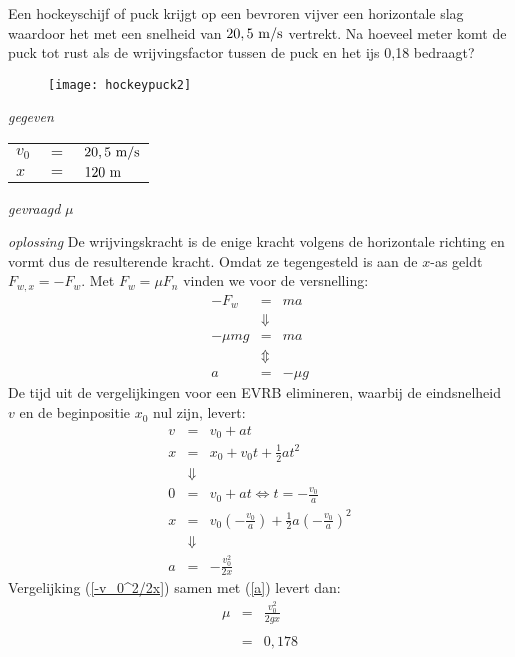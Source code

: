 \item Een hockeyschijf of puck krijgt op een bevroren vijver een horizontale slag waardoor het met een snelheid van $20,5~\rm m/s$ vertrekt. Na hoeveel meter komt de puck tot rust als de wrijvingsfactor tussen de puck en het ijs 0,18 bedraagt? %
\begin{oplossing}
\begin{figure}[h]
\begin{center}
\texttt{[image: hockeypuck2]}
\end{center}
\end{figure}
\newline
\item [\textit{gegeven}]
\begin{tabular}[t]{lcl}
$v_0$ &$=$& $20,5~\rm m/s$\\
$x$ &$=$& $120~\rm m$\\
\end{tabular}
\item [\textit{gevraagd}]
$\mu$
\item [\textit{oplossing}]
De wrijvingskracht is de enige kracht volgens de horizontale
richting en vormt dus de resulterende kracht. Omdat ze tegengesteld
is aan de $x$-as geldt $F_{w,x}=-F_w$. Met $F_w=\mu F_n$ vinden we
voor de versnelling:
\begin{eqnarray}
-F_w &=& ma\nonumber\\
&\Downarrow& \nonumber\\
-\mu mg &=&ma\nonumber\\
&\Updownarrow& \nonumber\\
a &=& -\mu g\label{a}
\end{eqnarray}
De tijd uit de vergelijkingen voor een EVRB elimineren, waarbij de
eindsnelheid $v$ en de beginpositie $x_0$ nul zijn, levert:
\begin{eqnarray}
v&=&v_0+at\nonumber\\
x&=&x_0+v_0t+\frac{1}{2}at^2\nonumber\\
&\Downarrow&\nonumber\\
0&=&v_0+at\Leftrightarrow t=-\frac{v_0}{a}\nonumber\\
x&=&v_0\left(-\frac{v_0}{a}\right)+\frac{1}{2}a\left(-\frac{v_0}{a}\right)^2\nonumber\\
&\Downarrow&\nonumber\\
a&=&-\frac{v_0^2}{2x}\label{-v_0^2/2x}
\end{eqnarray}
Vergelijking (\ref{-v_0^2/2x}) samen met (\ref{a}) levert dan:
\begin{eqnarray}
\mu &=& \frac{v_0^2}{2gx}\label{remvgl}\\
&&\nonumber\\
&=& 0,178\nonumber
\end{eqnarray}
\end{oplossing}